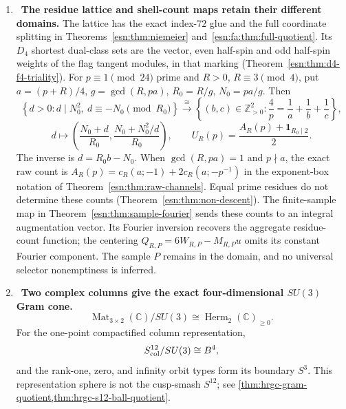 \begin{enumerate}[leftmargin=1.8em,itemsep=.65em]
\item \Verified\ \textbf{The residue lattice and shell-count maps retain
their different domains.}
The lattice has the exact index-$72$ glue and the full coordinate
splitting in Theorems~\ref{esn:thm:niemeier}
and~\ref{esn:fa:thm:full-quotient}. Its $D_4$ shortest dual-class
sets are the vector, even half-spin and odd half-spin weights of the
flag tangent modules, in that marking
(Theorem~\ref{esn:thm:d4-f4-triality}).
For $p\equiv1\pmod{24}$ prime and $R>0$, $R\equiv3\pmod4$, put
$a=(p+R)/4$, $g=\gcd(R,pa)$, $R_0=R/g$, $N_0=pa/g$. Then
\[
 \left\{d>0:d\mid N_0^2,\ d\equiv-N_0\pmod{R_0}\right\}
 \xrightarrow{\ \cong\ }
 \left\{(b,c)\in\mathbb Z_{>0}^2:
                    \frac4p=\frac1a+\frac1b+\frac1c\right\},
\]
\[
 d\longmapsto
 \left(\frac{N_0+d}{R_0},\frac{N_0+N_0^2/d}{R_0}\right),
 \qquad U_R(p)=\frac{A_R(p)+\mathbf1_{R_0\mid2}}2.
\]
The inverse is $d=R_0b-N_0$. When $\gcd(R,pa)=1$ and $p\nmid a$,
the exact raw count is
$A_R(p)=c_R(a;-1)+2c_R(a;-p^{-1})$ in the exponent-box notation
of Theorem~\ref{esn:thm:raw-channels}. Equal prime residues do not
determine these counts (Theorem~\ref{esn:thm:non-descent}).
The finite-sample map in Theorem~\ref{esn:thm:sample-fourier}
sends these counts to an integral augmentation vector. Its Fourier
inversion recovers the aggregate residue-count function; the centering
$Q_{R,P}=6W_{R,P}-M_{R,P}u$ omits its constant Fourier component.
The sample $P$ remains in the domain, and no universal selector
nonemptiness is inferred.

\item \Verified\ \textbf{Two complex columns give the exact
four-dimensional \(SU(3)\) Gram cone.}
\[
 \operatorname{Mat}_{3\times2}(\mathbb C)/SU(3)
 \cong\operatorname{Herm}_2(\mathbb C)_{\geq0}.
\]
For the one-point compactified column representation,
\[
 S^{12}_{\rm col}/SU(3)\cong B^4,
\]
and the rank-one, zero, and infinity orbit types form its boundary \(S^3\).
This representation sphere is not the cusp-smash \(S^{12}\); see
\cref{thm:hrgc-gram-quotient,thm:hrgc-s12-ball-quotient}.


\end{enumerate}

